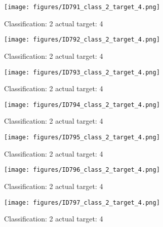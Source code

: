 \begin{figure}[h!]
\begin{center}
\texttt{[image: figures/ID791\_class\_2\_target\_4.png]}
\end{center}
\caption{ Classification: 2 actual target: 4}
\label{fig:ID791_class_2_target_4}
\end{figure}
\begin{figure}[h!]
\begin{center}
\texttt{[image: figures/ID792\_class\_2\_target\_4.png]}
\end{center}
\caption{ Classification: 2 actual target: 4}
\label{fig:ID792_class_2_target_4}
\end{figure}
\begin{figure}[h!]
\begin{center}
\texttt{[image: figures/ID793\_class\_2\_target\_4.png]}
\end{center}
\caption{ Classification: 2 actual target: 4}
\label{fig:ID793_class_2_target_4}
\end{figure}
\begin{figure}[h!]
\begin{center}
\texttt{[image: figures/ID794\_class\_2\_target\_4.png]}
\end{center}
\caption{ Classification: 2 actual target: 4}
\label{fig:ID794_class_2_target_4}
\end{figure}
\begin{figure}[h!]
\begin{center}
\texttt{[image: figures/ID795\_class\_2\_target\_4.png]}
\end{center}
\caption{ Classification: 2 actual target: 4}
\label{fig:ID795_class_2_target_4}
\end{figure}
\begin{figure}[h!]
\begin{center}
\texttt{[image: figures/ID796\_class\_2\_target\_4.png]}
\end{center}
\caption{ Classification: 2 actual target: 4}
\label{fig:ID796_class_2_target_4}
\end{figure}
\begin{figure}[h!]
\begin{center}
\texttt{[image: figures/ID797\_class\_2\_target\_4.png]}
\end{center}
\caption{ Classification: 2 actual target: 4}
\label{fig:ID797_class_2_target_4}
\end{figure}
